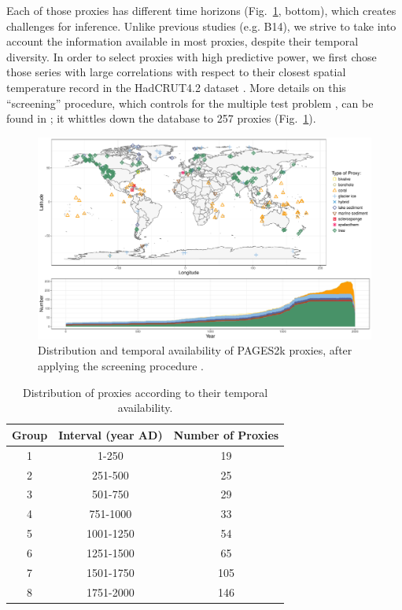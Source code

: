 \documentclass[12pt]{amsart}
\theoremstyle{plain}
\theoremstyle{definition}
\theoremstyle{remark}
\begin{document}
 Each of those proxies has different time horizons (Fig.~\ref{fig:proxy}, bottom), which creates challenges for inference. Unlike previous studies (e.g. B14), we strive to take into account the information available in most proxies, despite their temporal diversity.
In order to select proxies with high predictive power, we first chose those series with large correlations with respect to
their closest spatial temperature record in the HadCRUT4.2 dataset \citep{Morice2012}. More
details on this ``screening'' procedure, which controls for the multiple test problem \citep{BenjaminiHochberg95}, can be found in \citet{PAGES2kSD2017short}; it whittles down the database to 257 proxies (Fig.~\ref{fig:proxy}).   
\begin{figure}
  \centering
  \includegraphics[scale=0.40]{CombinedMap_Area}
  \caption{Distribution and temporal availability of PAGES2k proxies, after applying the screening procedure \cite{PAGES2kSD2017short}.}
  \label{fig:proxy}
\end{figure}

\begin{table}[h!]
  \centering
  \begin{tabular}{c|c|c}
    \toprule
    Group & Interval (year AD) & Number of Proxies\\
    \midrule
    1 & 1-250 & 19 \\
    2 & 251-500 & 25 \\
    3 & 501-750 & 29 \\
    4 & 751-1000 & 33 \\
    5 & 1001-1250 & 54 \\
    6 & 1251-1500 & 65 \\
    7 & 1501-1750 & 105 \\
    8 & 1751-2000 & 146 \\
    \bottomrule
  \end{tabular}
  \caption{Distribution of proxies according to their temporal availability.}
  \label{tab:distdate}
\end{table}
\end{document}
